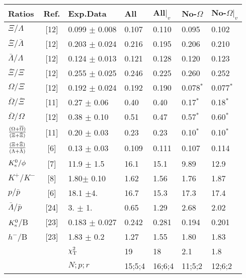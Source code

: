 \begin{mdframed}[linecolor=gray,roundcorner=12pt,backgroundcolor=Dandelion!15,linewidth=1pt,leftmargin=0cm,rightmargin=0cm,topline=true,bottomline=true,skipabove=12pt]
\begin{center}
\begin{tabular}{|lcl|ll|ll|}
\hline
 Ratios & $\!\!\!\!$Ref. & Exp.Data & All & All$|_v$& No-$\Omega$ & No-$\Omega|_v$ \\
\hline
${\Xi}/{\Lambda}$ & [12] &0.099 $\pm$ 0.008 & 0.107 & 0.110 & 0.095 & 0.102 \\
${\overline{\Xi}}/{\bar\Lambda}$ & [12] &0.203 $\pm$ 0.024 & 0.216 & 0.195 & 0.206 & 0.210 \\
${\bar\Lambda}/{\Lambda}$ & [12] &0.124 $\pm$ 0.013 & 0.121 & 0.128 & 0.120 & 0.123 \\
${\overline{\Xi}}/{\Xi}$ & [12] &0.255 $\pm$ 0.025 & 0.246 & 0.225 & 0.260 & 0.252 \\
${\Omega}/{\Xi}$ & [12] &0.192 $\pm$ 0.024 & 0.192 & 0.190 &0.078$^*$&0.077$^*$\\
${\overline{\Omega}}/{\overline{\Xi}}$ & [11] &0.27 $\pm$ 0.06 & 0.40 & 0.40 &0.17$^*$ &0.18$^*$ \\
${\overline{\Omega}}/{\Omega}$ & [12] &0.38 $\pm$ 0.10 & 0.51 & 0.47 &0.57$^*$ &0.60$^*$ \\
$(\Omega+\overline{\Omega})\over(\Xi+\bar{\Xi})$& [11] &0.20 $\pm$ 0.03
  & 0.23 & 0.23 &0.10$^*$ &0.10$^*$ \\
\hline
$(\Xi+\bar{\Xi})\over(\Lambda+\bar{\Lambda})$& [6] &0.13 $\pm$ 0.03
  & 0.109 & 0.111 & 0.107 & 0.114 \\
${K^0_{\rm s}}/\phi$ & [7] & 11.9 $\pm$ 1.5\ \ & 16.1 & 15.1 & 9.89 & 12.9 \\
${K^+}/{K^-}$ & [8] & 1.80$\pm$ 0.10 & 1.62 & 1.56 & 1.76 & 1.87 \\
$p/{\bar p}$ & [6] &18.1 $\pm$4.\ \ \ \ & 16.7 & 15.3 & 17.3 & 17.4 \\
${\bar\Lambda}/{\bar p}$ &[24] & 3. $\pm$ 1. & 0.65 & 1.29 & 2.68 & 2.02 \\
${K^0_{\rm s}}$/B & [23] & 0.183 $\pm$ 0.027 & 0.242 & 0.281 & 0.194 & 0.201 \\
${h^-}$/B & [23] & 1.83 $\pm $ 0.2\ \ & 1.27 & 1.55 & 1.80 & 1.83 \\
\hline
 & & $\chi^2_{\rm T}$ & 19 & 18 & 2.1 & 1.8\\
 & & $ N;p;r$ &15;5;4 & 16;6;4 & 11;5;2 & 12;6;2\\
\hline
\end{tabular}
\end{center}


\end{mdframed}
